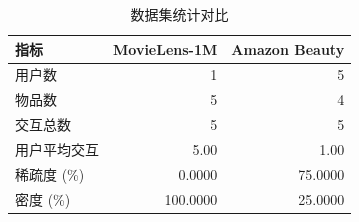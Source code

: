 \begin{table}[htbp]
\centering
\caption{数据集统计对比}
\label{tab:dataset_stats}
\begin{tabular}{lrr}
\hline
指标 & MovieLens-1M & Amazon Beauty \\
\hline
用户数 & 1 & 5 \\
物品数 & 5 & 4 \\
交互总数 & 5 & 5 \\
用户平均交互 & 5.00 & 1.00 \\
稀疏度 (\%) & 0.0000 & 75.0000 \\
密度 (\%) & 100.0000 & 25.0000 \\
\hline
\end{tabular}
\end{table}